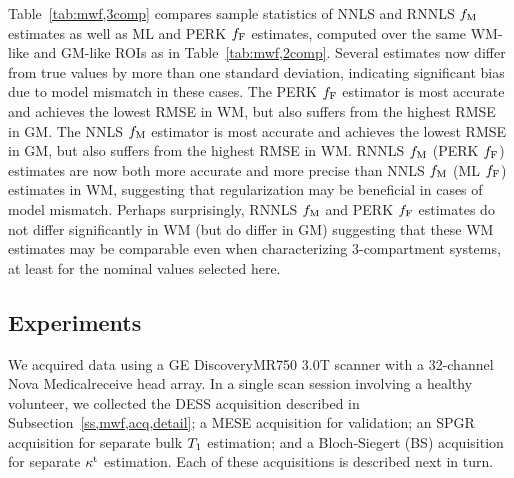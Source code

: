 Table~\ref{tab:mwf,3comp} compares sample statistics
of NNLS and RNNLS $f_\mathrm{M}$ estimates
as well as ML and PERK $f_{\mathrm{F}}$ estimates,
computed over the same WM-like and GM-like ROIs
as in Table~\ref{tab:mwf,2comp}.
Several estimates now differ from true values
by more than one standard deviation,
indicating significant bias due to model mismatch
in these cases.
The PERK $f_{\mathrm{F}}$ estimator is most accurate 
and achieves the lowest RMSE in WM,
but also suffers from the highest RMSE in GM.
The NNLS $f_\mathrm{M}$ estimator is most accurate
and achieves the lowest RMSE in GM,
but also suffers from the highest RMSE in WM.
RNNLS $f_\mathrm{M}$ (PERK $f_{\mathrm{F}}$) estimates are now
both more accurate and more precise
than NNLS $f_\mathrm{M}$ (ML $f_{\mathrm{F}}$) estimates
in WM,
suggesting that regularization may be beneficial
in cases of model mismatch.
Perhaps surprisingly,
RNNLS $f_\mathrm{M}$ and PERK $f_{\mathrm{F}}$ estimates 
do not differ significantly in WM
(but do differ in GM)
suggesting that these WM estimates may be comparable
even when characterizing 3-compartment systems,
at least for the nominal values selected here.

\subsection{\Invivo Experiments}
\label{ss,mwf,exp,invivo}

We acquired \invivo data 
using a GE Discovery\tmark MR750 3.0T scanner
with a 32-channel Nova Medical\regis receive head array.
In a single scan session 
involving a healthy volunteer,
we collected the DESS acquisition
described in Subsection~\ref{ss,mwf,acq,detail};
a MESE acquisition for validation;
an SPGR acquisition
for separate bulk $T_1$ estimation;
and a Bloch-Siegert (BS) acquisition
for separate $\kappa^{\mathrm{t}}$ estimation.
Each of these acquisitions is described next in turn.

